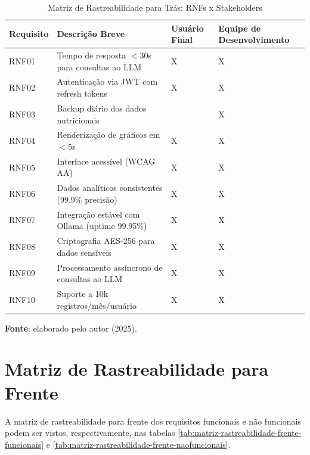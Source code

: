 \begin{longtable}{|>{\centering\arraybackslash}p{}|>{\arraybackslash}p{}|>{\centering\arraybackslash}p{}|>{\centering\arraybackslash}p{}|}
    \caption{Matriz de Rastreabilidade para Trás: RNFs x Stakeholders}
    \label{tab:matriz-rastreabilidade-atras-naofuncionais}\\
    \hline 
    \textbf{Requisito} & \textbf{Descrição Breve} & \textbf{Usuário Final} & \textbf{Equipe de Desenvolvimento} \\
    \hline
    \endfirsthead
    \endhead
    RNF01 & Tempo de resposta $<30$s para consultas ao LLM & X & X \\
    \hline
    RNF02 & Autenticação via JWT com refresh tokens & X & X \\
    \hline
    RNF03 & Backup diário dos dados nutricionais &  & X \\
    \hline
    RNF04 & Renderização de gráficos em $<5$s & X & X \\
    \hline
    RNF05 & Interface acessível (WCAG AA) & X & X \\
    \hline
    RNF06 & Dados analíticos consistentes (99.9\% precisão) & X & X \\
    \hline
    RNF07 & Integração estável com Ollama (uptime 99.95\%) & X & X \\
    \hline
    RNF08 & Criptografia AES-256 para dados sensíveis & X & X \\
    \hline
    RNF09 & Processamento assíncrono de consultas ao LLM & X & X \\
    \hline
    RNF10 & Suporte a 10k registros/mês/usuário & X & X \\
    \hline
\end{longtable}
\begin{center} \small{\textbf{Fonte}: elaborado pelo autor (2025).} \end{center}

\section{Matriz de Rastreabilidade para Frente}

A matriz de rastreabilidade para frente dos requisitos funcionais e não funcionais podem ser vistos, respectivamente, nas tabelas \ref{tab:matriz-rastreabilidade-frente-funcionais} e \ref{tab:matriz-rastreabilidade-frente-naofuncionais}.

